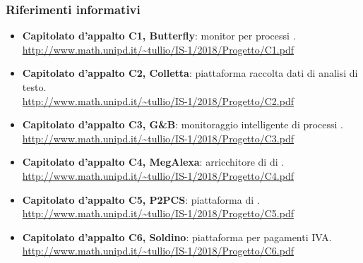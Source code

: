         \subsubsection{Riferimenti informativi}
            \begin{itemize}
                \item \textbf{Capitolato d'appalto C1, Butterfly}:
                    monitor per processi . \\
                    \url{http://www.math.unipd.it/~tullio/IS-1/2018/Progetto/C1.pdf}
                \item \textbf{Capitolato d'appalto C2, Colletta}:
                    piattaforma raccolta dati di analisi di testo. \\
                    \url{http://www.math.unipd.it/~tullio/IS-1/2018/Progetto/C2.pdf}
                \item \textbf{Capitolato d'appalto C3, G\&B}:
                    monitoraggio intelligente di processi . \\
                    \url{http://www.math.unipd.it/~tullio/IS-1/2018/Progetto/C3.pdf}
                \item \textbf{Capitolato d'appalto C4, MegAlexa}:
                    arricchitore di  di  . \\
                    \url{http://www.math.unipd.it/~tullio/IS-1/2018/Progetto/C4.pdf}
                \item \textbf{Capitolato d'appalto C5, P2PCS}:
                    piattaforma di  . \\
                    \url{http://www.math.unipd.it/~tullio/IS-1/2018/Progetto/C5.pdf}
                \item \textbf{Capitolato d'appalto C6, Soldino}:
                    piattaforma  per pagamenti IVA. \\
                    \url{http://www.math.unipd.it/~tullio/IS-1/2018/Progetto/C6.pdf}
            \end{itemize}
